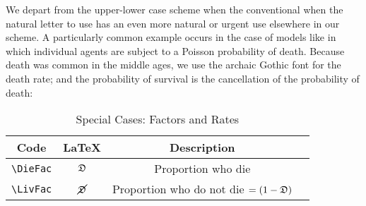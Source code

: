 We depart from the upper-lower case scheme when the conventional
when the natural letter to use has an even more natural or urgent use elsewhere in our scheme.
A particularly common example occurs in the case of models like \cite{blanchardFinite} in which
individual agents are subject to a Poisson probability of death.  Because death was common in the
middle ages, we use the archaic Gothic font for the death rate; and the probability of survival is the cancellation of the probability of death:
\begin{table}[h]
	\centering
	\begin{tabular}{|>{\ttfamily}cccl|}
		\hline
		 Code & LaTeX & Description &  \\
		\hline
   \verb|\DieFac|     & $\mathfrak{D}$     & Proportion who die  &
\\ \verb|\LivFac|     & $\cancel{\mathfrak{D}}$     & Proportion who do not die $=(1-\mathfrak{D})$ &
\\	\hline
	\end{tabular}
	\caption{Special Cases: Factors and Rates}
	\label{table:SpecialFactors}
\end{table}



